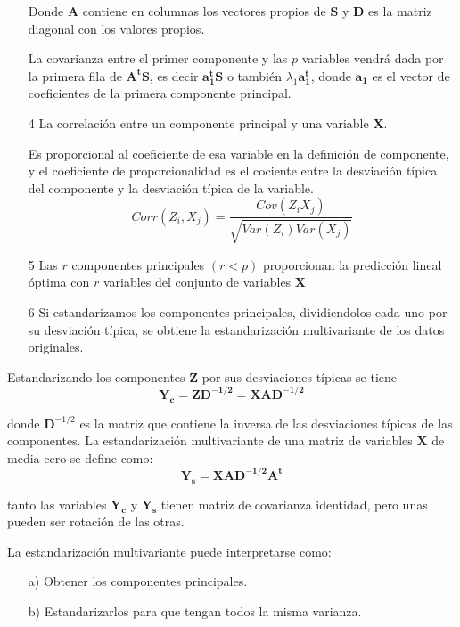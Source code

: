 \documentclass[12pt,letterpaper]{report} %
\begin{document}
\begin{itemize}
Donde $\mathbf{A}$ contiene en columnas los vectores propios de $\mathbf{S}$ y $\mathbf{D}$ es la matriz diagonal con los valores propios.

La covarianza entre el primer componente y las $p$ variables vendrá dada por la primera fila de $\mathbf{A^tS}$, es decir $\mathbf{a_1^t S}$ o también $\lambda_1 \mathbf{a_1^t}$, donde $\mathbf{a_1}$ es el vector de coeficientes de la primera componente principal.

\item[4]  La correlación entre un componente principal y una variable $\mathbf{X}$.

Es proporcional al coeficiente de esa variable en la definición de componente, y el coeficiente de proporcionalidad es el cociente entre la desviación típica del componente y la desviación típica de la variable.
$$Corr(Z_i,X_j)=\frac{Cov(Z_iX_j)}{\sqrt{Var(Z_i)Var(X_j)}}$$

\item[5]  Las $r$ componentes principales $(r < p)$ proporcionan la predicción lineal óptima con $r$ variables del conjunto de variables $\mathbf{X}$

\item[6]  Si estandarizamos los componentes principales, dividiendolos cada uno por su desviación típica, se obtiene la estandarización multivariante de los datos originales.
\end{itemize}

Estandarizando los componentes $\mathbf{Z}$ por sus desviaciones típicas se tiene
$$\mathbf{Y_c}=\mathbf{ZD^{-1/2}}=\mathbf{XAD^{-1/2}}$$

donde $\mathbf{D}^{-1/2}$ es la matriz que contiene la inversa de las desviaciones típicas de las componentes. La estandarización multivariante de una matriz de variables $\mathbf{X}$ de media cero se define como:
$$\mathbf{Y_s}=\mathbf{XAD^{-1/2}A^t}$$

tanto las variables $\mathbf{Y_c}$ y $\mathbf{Y_s}$ tienen matriz de covarianza identidad, pero unas pueden ser rotación de las otras.

La estandarización multivariante puede interpretarse como:

\begin{itemize}
\item[a)] Obtener los componentes principales.
	
\item[b)] Estandarizarlos para que tengan todos la misma varianza.
\end{itemize}
\end{document}
